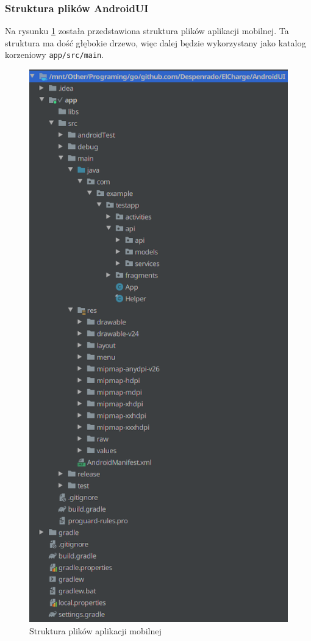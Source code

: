 \subsubsection{Struktura plików AndroidUI}
Na rysunku \ref{fig:frontend_file_structure} została przedstawiona struktura plików aplikacji mobilnej. Ta struktura ma dość głębokie drzewo, więc dalej będzie wykorzystany jako katalog korzeniowy \texttt{app/src/main}.

\begin{figure}[ht]
\centering
\includegraphics[width=0.4\linewidth]{rys03/frontend_file_struct.png}
\caption{Struktura plików aplikacji mobilnej}
\label{fig:frontend_file_structure}
\end{figure}

